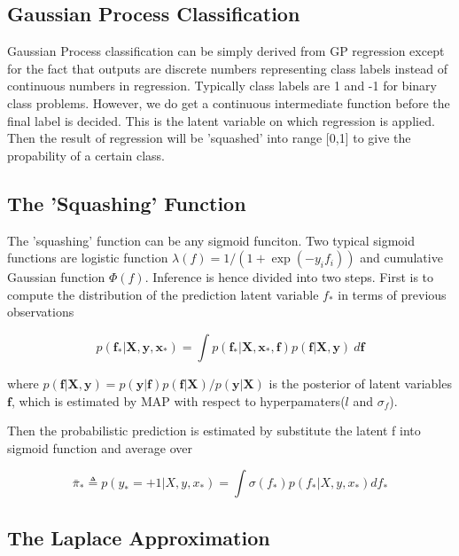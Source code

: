 \documentclass[14pt]{report}
\numberwithin{equation}{chapter}
\begin{document}
\begin{spacing}{2}
\section{Gaussian Process Classification}
Gaussian Process classification can be simply derived from GP regression except for the fact that outputs are discrete numbers representing class labels instead of continuous numbers in regression. Typically class labels are 1 and -1 for binary class problems. However, we do get a continuous intermediate function before the final label is decided. This is the latent variable on which regression is applied. Then the result of regression will be 'squashed' into range [0,1] to give the propability of a certain class.


\subsection{The 'Squashing' Function}
The 'squashing' function can be any sigmoid funciton. Two typical sigmoid functions are logistic function $\lambda (f) = 1/(1 + \operatorname{exp}(-y_if_i))$ and cumulative Gaussian function $\Phi (f) $. Inference is hence divided into two steps. First is to compute  the distribution of the prediction latent variable $f_*$ in terms of previous observations 

\begin{equation}
\label{classification_prediction}
p(\boldsymbol f_*|\boldsymbol X,\boldsymbol y,\boldsymbol x_*) = \int p(\boldsymbol f_*|\boldsymbol X,\boldsymbol x_*,\boldsymbol f)p(\boldsymbol f|\boldsymbol X,\boldsymbol y)\ d\boldsymbol f
\end{equation}

where \(p(\boldsymbol f|\boldsymbol X,\boldsymbol y) = {p(\boldsymbol y|\boldsymbol f)p(\boldsymbol f|\boldsymbol X)}/{p(\boldsymbol y|\boldsymbol X)}\) is the posterior of latent variables $\boldsymbol f$, which is estimated by MAP with respect to hyperpamaters($l$ and $\sigma_f$).

Then the probabilistic prediction is estimated by substitute the latent f into sigmoid function and average over 

\begin{equation}
\label{predictive_probability}
\bar{\pi}_* \triangleq p(y_* = +1|X,y,x_*) = \int \sigma (f_*)p(f_*|X,y,x_*) df_*
\end{equation}


\subsection{The Laplace Approximation}


\end{spacing}
\end{document}
